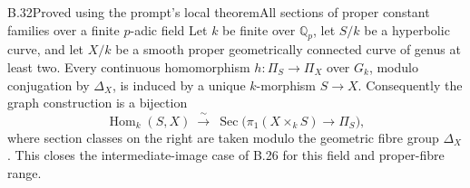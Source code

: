\begin{statement}{B.32}{Proved using the prompt's local theorem}{All sections of proper constant families over a finite $p$-adic field}
Let $k$ be finite over $\mathbb Q_p$, let $S/k$ be a
hyperbolic curve, and let $X/k$ be a smooth proper
geometrically connected curve of genus at least two.
Every continuous homomorphism
$h:\Pi_S\to\Pi_X$ over $G_k$, modulo conjugation by
$\Delta_X$, is induced by a unique $k$-morphism $S\to X$.
Consequently the graph construction is a bijection
\[
 \operatorname{Hom}_k(S,X)
 \ \xrightarrow{\ \sim\ }\
 \operatorname{Sec}\bigl(\pi_1(X\times_k S)\to\Pi_S\bigr),
\tag{B.32.1}
\]
where section classes on the right are taken modulo
the geometric fibre group $\Delta_X$.
This closes the intermediate-image case of B.26 for
this field and proper-fibre range.
\end{statement}
